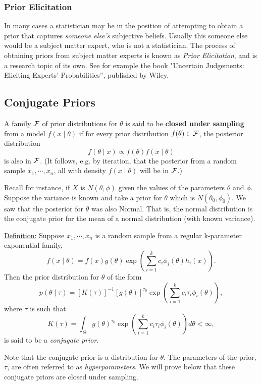 \documentclass[12pt]{article}
\begin{document}
\subsubsection{Prior Elicitation}

In many cases a statistician may be in the position of attempting to obtain a prior that
captures {\it someone else's} subjective beliefs. Usually this someone else would be a subject matter expert, who is not a statistician. The process of obtaining priors from subject
matter experts is known as {\it Prior Elicitation}, and is a research topic of its own.
See for example the book "Uncertain Judgements: Eliciting Experts' Probabilities'', published by Wiley.



\subsection{Conjugate Priors}

A family $\cal F$ of prior distributions for $\theta$ is said to be
{\bf closed under sampling} from a model $f(x\mid \theta)$ if for
every prior distribution $f(\theta)\in {\cal F}$, the posterior
distribution
$$f(\theta\mid x)\propto f(\theta)f(x\mid\theta)$$
is also in $\cal F$.  (It follows, e.g. by iteration, that the
posterior from a random sample $x_1,\cdots,x_n$, all with density
$f(x\mid \theta)$ will be in $\cal F$.)

Recall for instance,  if $X$ is $N(\theta,\phi)$ given
the values of the parameters $\theta$ and $\phi$.  Suppose the
variance is known and take a prior for $\theta$ which is
$N(\theta_0,\phi_0)$.  We saw that the posterior for $\theta$ was also
Normal. That is, the normal distribution is the conjugate prior for the mean of a normal distribution (with known variance).

\underline{Definition:}  Suppose $x_1,\cdots,x_n$ is a random sample from a
  regular k-parameter exponential family,
$$f(x\mid \theta)=f(x)g(\theta)\exp\left( \sum_{i=1}^k c_i \phi_i
  (\theta) h_i (x) \right).$$
 Then the prior distribution
  for $\theta$ of the form
$$p(\theta\mid\tau)=[K(\tau)]^{-1} [g(\theta)]^{\tau_0} \exp\left(
  \sum_{i=1}^k c_i \tau_i \phi_i (\theta)  \right),$$
where $\tau$ is such that
$$
K(\tau) = \int_{\Theta} g(\theta)^{\tau_0} \exp \left(\sum_{i=1}^k c_i \tau_i \phi_i(\theta)\right) d\theta < \infty,
$$
is said to be a {\it conjugate prior}.  


Note that the conjugate prior is a distribution for $\theta$.  The parameters of the prior, $\tau$, are often referred to as {\it hyperparameters}.  We will prove below that these
conjugate priors are closed under sampling.
\end{document}
